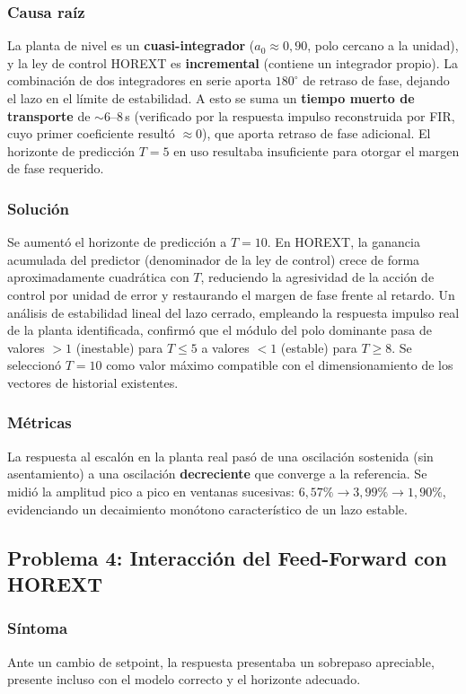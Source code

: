 \subsubsection{Causa raíz}
La planta de nivel es un \textbf{cuasi-integrador} ($a_0 \approx 0{,}90$, polo cercano a la unidad), y la ley de control HOREXT es \textbf{incremental} (contiene un integrador propio). La combinación de dos integradores en serie aporta $180^\circ$ de retraso de fase, dejando el lazo en el límite de estabilidad. A esto se suma un \textbf{tiempo muerto de transporte} de $\sim 6$--$8\,$s (verificado por la respuesta impulso reconstruida por FIR, cuyo primer coeficiente resultó $\approx 0$), que aporta retraso de fase adicional. El horizonte de predicción $T=5$ en uso resultaba insuficiente para otorgar el margen de fase requerido.

\subsubsection{Solución}
Se aumentó el horizonte de predicción a $T=10$. En HOREXT, la ganancia acumulada del predictor (denominador de la ley de control) crece de forma aproximadamente cuadrática con $T$, reduciendo la agresividad de la acción de control por unidad de error y restaurando el margen de fase frente al retardo. Un análisis de estabilidad lineal del lazo cerrado, empleando la respuesta impulso real de la planta identificada, confirmó que el módulo del polo dominante pasa de valores $>1$ (inestable) para $T \le 5$ a valores $<1$ (estable) para $T \ge 8$. Se seleccionó $T=10$ como valor máximo compatible con el dimensionamiento de los vectores de historial existentes.

\subsubsection{Métricas}
La respuesta al escalón en la planta real pasó de una oscilación sostenida (sin asentamiento) a una oscilación \textbf{decreciente} que converge a la referencia. Se midió la amplitud pico a pico en ventanas sucesivas: $6{,}57\% \rightarrow 3{,}99\% \rightarrow 1{,}90\%$, evidenciando un decaimiento monótono característico de un lazo estable.

\subsection{Problema 4: Interacción del Feed-Forward con HOREXT}

\subsubsection{Síntoma}
Ante un cambio de setpoint, la respuesta presentaba un sobrepaso apreciable, presente incluso con el modelo correcto y el horizonte adecuado.


